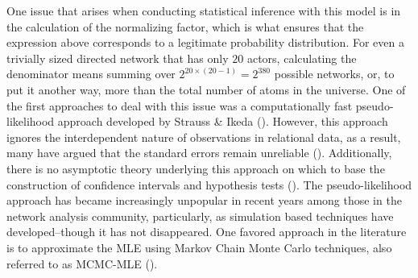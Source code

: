 \documentclass[12pt,pdflatex]{elsarticle}
\begin{document}
One issue that arises when conducting statistical inference with this model is in the calculation of the normalizing factor, which is what ensures that the expression above corresponds to a legitimate probability distribution. For even a trivially sized directed network that has only $20$ actors, calculating the denominator means summing over $2^{20\times(20-1)} = 2^{380}$ possible networks, or, to put it another way, more than the total number of atoms in the universe. One of the first approaches to deal with this issue was a computationally fast pseudo-likelihood approach developed by Strauss \& Ikeda (\citealt{strauss:ikeda:1990}). However, this approach ignores the interdependent nature of observations in relational data, as a result, many have argued that the standard errors remain unreliable (\citealt{vanduijn:etal:2009}). Additionally, there is no asymptotic theory underlying this approach on which to base the construction of confidence intervals and hypothesis tests (\citealt{kolaczyk:2009}). The pseudo-likelihood approach has became increasingly unpopular in recent years among those in the network analysis community, particularly, as simulation based techniques have developed--though it has not disappeared. One favored approach in the literature is to approximate the MLE using Markov Chain Monte Carlo techniques, also referred to as MCMC-MLE (\citealt{geyer:thompson:1992,snijders:2002,handcock:2003a}).
\end{document}
